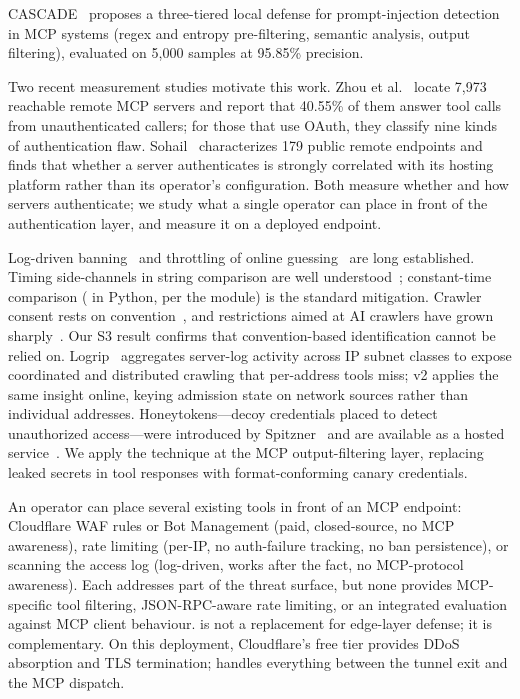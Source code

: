 \documentclass[10pt,twocolumn]{article}
\begin{document}
CASCADE~\citep{cascade2026} proposes a three-tiered local defense for
prompt-injection detection in MCP systems (regex and entropy pre-filtering,
semantic analysis, output filtering), evaluated on 5{,}000 samples at 95.85\%
precision.

Two recent measurement studies motivate this work. Zhou
et al.~\citep{zhou2026mcpauth} locate 7,973 reachable remote MCP servers and
report that 40.55\% of them answer tool calls from unauthenticated callers;
for those that use OAuth, they classify nine kinds of authentication flaw.
Sohail~\citep{sohail2026remote} characterizes 179 public remote endpoints and
finds that whether a server authenticates is strongly correlated with its
hosting platform rather than its operator's configuration. Both measure
whether and how servers authenticate; we study what a single operator can
place in front of the authentication layer, and measure it on a deployed
endpoint.

Log-driven banning~\citep{fail2ban} and throttling of online
guessing~\citep{nist80063b} are long established. Timing side-channels in
string comparison are well understood~\citep{brumley2011remote}; constant-time
comparison ( in Python, per the 
module) is the standard mitigation. Crawler consent rests on
convention~\citep{rfc9309}, and restrictions aimed at AI crawlers have grown
sharply~\citep{longpre2024consent}. Our S3 result confirms that
convention-based identification cannot be relied on.
Logrip~\citep{hoetzlein2025logrip} aggregates server-log activity across IP
subnet classes to expose coordinated and distributed crawling that
per-address tools miss; v2 applies the same insight online, keying admission
state on network sources rather than individual addresses.
Honeytokens---decoy credentials placed to detect unauthorized
access---were introduced by Spitzner~\citep{spitzner2003honeytokens} and are
available as a hosted service~\citep{canarytokens}. We apply the technique at
the MCP output-filtering layer, replacing leaked secrets in tool responses
with format-conforming canary credentials.

An operator can place several existing tools in front of an MCP endpoint:
Cloudflare WAF rules or Bot Management (paid, closed-source, no MCP awareness),
 rate limiting (per-IP, no auth-failure tracking, no ban persistence),
or  scanning the access log (log-driven, works after the fact,
no MCP-protocol awareness). Each addresses part of the threat surface, but none
provides MCP-specific tool filtering, JSON-RPC-aware rate limiting, or an
integrated evaluation against MCP client behaviour. \sys{} is not a replacement
for edge-layer defense; it is complementary. On this deployment, Cloudflare's
free tier provides DDoS absorption and TLS termination; \sys{} handles
everything between the tunnel exit and the MCP dispatch.
\end{document}
